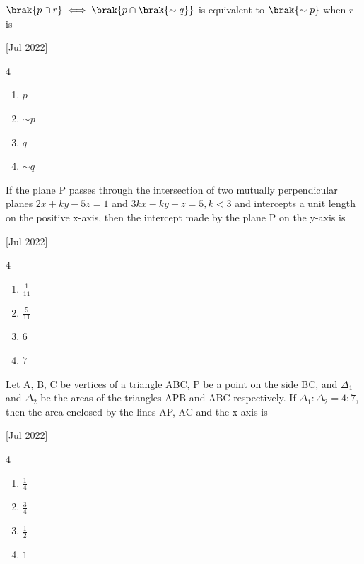     \item $\brak{p\cap r}\iff \brak{p\cap\brak{\sim q}}$ is equivalent to $\brak{\sim p}$ when $r$ is
    
    \hfill{[Jul 2022]}

        \begin{multicols}{4}
            \begin{enumerate}
                \item $p$
                \item $\sim p$
                \item $q$
                \item $\sim q$
            \end{enumerate}
        \end{multicols}

    \item If the plane P passes through the intersection of two mutually perpendicular planes $2x+ky-5z=1$ and $3kx-ky+z=5,k<3$ and intercepts a unit length on the positive x-axis, then the intercept made by the plane P on the y-axis is 
    
    \hfill{[Jul 2022]}

		\begin{multicols}{4}
			\begin{enumerate}
				\item $\frac{1}{11}$
				\item $\frac{5}{11}$
				\item $6$
				\item $7$
			\end{enumerate}
		\end{multicols}

    \item Let A, B, C be vertices of a triangle ABC, P be a point on the side BC, and $\Delta_1$ and $\Delta_2$ be the areas of the triangles APB and ABC respectively. If $\Delta_1:\Delta_2=4:7$, then the area enclosed by the lines AP, AC and the x-axis is
    
    \hfill{[Jul 2022]}

        \begin{multicols}{4}
            \begin{enumerate}
                \item $\frac{1}{4}$
                \item $\frac{3}{4}$
                \item $\frac{1}{2}$
                \item $1$
            \end{enumerate}
        \end{multicols}

